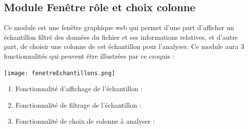 		\subsection{Module Fenêtre rôle et choix colonne}
			Ce module est une fenêtre graphique web qui permet d'une part d'afficher un échantillon filtré des données du fichier et ses informations relatives, et d'autre part, de choisir une colonne de cet échantillon pour l'analyser. Ce module aura 3 fonctionnalités qui peuvent être illustrées par ce croquis :
			\begin{center}\texttt{[image: fenetreEchantillons.png]}\end{center}
			\begin{enumerate}
				\vspace{1em}\item Fonctionnalité d'affichage de l'échantillon :
				\vspace{1em}\item Fonctionnalité de filtrage de l'échantillon :
				\vspace{1em}\item Fonctionnalité de choix de colonne à analyser :
			\end{enumerate}
			
			
